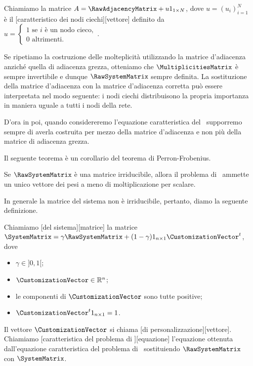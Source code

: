 \begin{Definition}
	Chiamiamo  la matrice $\AdjacencyMatrix = \RawAdjacencyMatrix + u \Ones{1}{N}$, dove $u = (u_i)_{i = 1}^N$ \`e il [caratteristico dei nodi ciechi][vettore] definito da $u = \begin{cases} 1\text{ se $i$ \`e un nodo cieco},\\ 0\text{ altrimenti}.\end{cases}$.
\end{Definition}
\par Se ripetiamo la costruzione delle molteplicit\`a utilizzando la matrice d'adiacenza anzich\'e quella di adiacenza grezza, otteniamo che $\MultiplicitiesMatrix$ \`e sempre invertibile e dunque $\RawSystemMatrix$ sempre definita. La sostituzione della matrice d'adiacenza con la matrice d'adiacenza corretta pu\`o essere interpretata nel modo seguente: i nodi ciechi distribuisono la propria importanza in maniera uguale a tutti i nodi della rete.
\par D'ora in poi, quando considereremo l'equazione caratteristica del \PageRank\ supporremo sempre di averla costruita per mezzo della matrice d'adiacenza e non pi\`u della matrice di adiacenza grezza.
\par Il seguente teorema \`e un corollario del teorema di Perron-Frobenius.
\begin{Corollary}
	Se $\RawSystemMatrix$ \`e una matrice irriducibile, allora il problema di \PageRank\ ammette un unico vettore dei pesi a meno di moltiplicazione per scalare.
\end{Corollary}
\par In generale la matrice del sistema non \`e irriducibile, pertanto, diamo la seguente definizione.
\begin{Definition}
	Chiamiamo [del sistema][matrice] la matrice $\SystemMatrix = \gamma\RawSystemMatrix + (1 - \gamma)\Ones{n}{1}\Transposed{\CustomizationVector}$, dove
	\begin{itemize}
		\item $\gamma \in ]0,1[$;
		\item $\CustomizationVector \in \mathbb{R}^n$;
		\item le componenti di $\CustomizationVector$ sono tutte positive;
		\item $\Transposed{\CustomizationVector}\Ones{n}{1} = 1$.
	\end{itemize}
	Il vettore $\CustomizationVector$ si chiama [di personalizzazione][vettore]. Chiamiamo [caratteristica del problema di \PageRank][equazione] l'equazione ottenuta dall'equazione caratteristica del problema di \PageRank\ sostituiendo $\RawSystemMatrix$ con $\SystemMatrix$.
\end{Definition}
